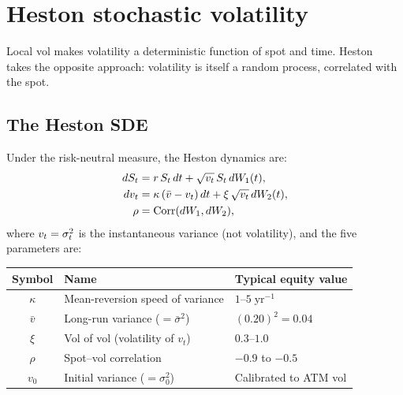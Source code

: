 \section{Heston stochastic volatility}
\label{sec:heston}

Local vol makes volatility a deterministic function of spot and time.
Heston~\citep{heston1993closed} takes the opposite approach: volatility
is itself a random process, correlated with the spot.

\subsection{The Heston SDE}
\label{subsec:heston_sde}

Under the risk-neutral measure, the Heston dynamics are:
\begin{align}
  dS_t &= r\,S_t\,dt
              + \sqrt{v_t}\,S_t\,dW_1(t),
  \label{eq:heston_spot} \\
  dv_t    &= \kappa\,(\bar{v} - v_t)\,dt
              + \xi\,\sqrt{v_t}\,dW_2(t),
  \label{eq:heston_var} \\
  \rho    &= \operatorname{Corr}(dW_1, dW_2),
  \notag
\end{align}
where $v_t = \sigma_t^2$ is the instantaneous variance (not
volatility), and the five parameters are:

\begin{keyfactbox}
\label{fact:heston_params}
\begin{center}
\begin{tabular}{cll}
  \toprule
  Symbol & Name & Typical equity value \\
  \midrule
  $\kappa$ & Mean-reversion speed of variance
           & $1$--$5\;\text{yr}^{-1}$ \\
  $\bar{v}$ & Long-run variance ($= \bar\sigma^2$)
             & $(0.20)^2 = 0.04$ \\
  $\xi$     & Vol of vol (volatility of $v_t$)
             & $0.3$--$1.0$ \\
  $\rho$    & Spot--vol correlation
             & $-0.9$ to $-0.5$ \\
  $v_0$     & Initial variance ($= \sigma_0^2$)
             & Calibrated to ATM vol \\
  \bottomrule
\end{tabular}
\end{center}
\end{keyfactbox}

